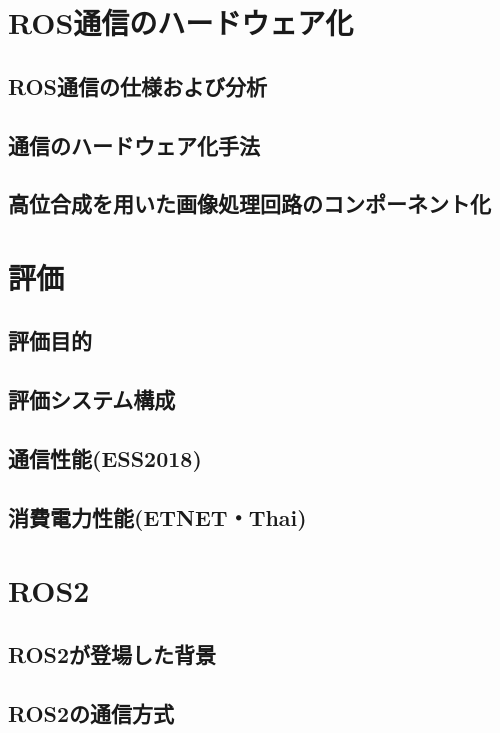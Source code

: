 \documentclass[a4paper,11pt,fleqn]{jbook}
\begin{document}
\newpage
\chapter{ROS通信のハードウェア化}
\label{chp:3}

\section{ROS通信の仕様および分析}
\label{chp:3_1}

\section{通信のハードウェア化手法}
\label{chp:3_2}

\section{高位合成を用いた画像処理回路のコンポーネント化}
\label{chp:3_3}


\newpage
\chapter{評価}
\label{chp:4}

\section{評価目的}
\label{chp:4_1}

\section{評価システム構成}
\label{chp:4_2}

\section{通信性能(ESS2018)}
\label{chp:4_3}

\section{消費電力性能(ETNET・Thai)}
\label{chp:4_4}


\newpage
\chapter{ROS2}
\label{chp:5}

\section{ROS2が登場した背景}
\label{chp:5_1}

\section{ROS2の通信方式}
\label{chp:5_2}

\end{document}
